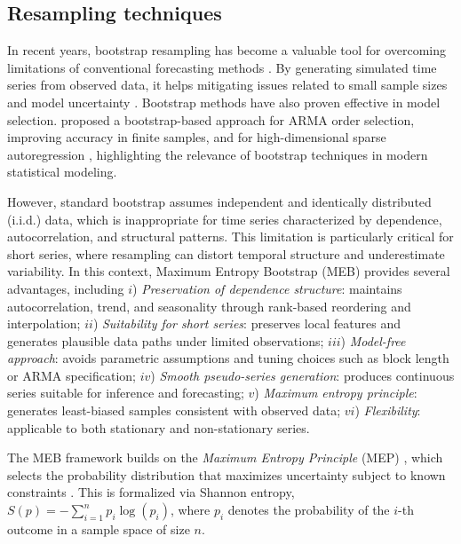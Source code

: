 \documentclass[ijoc,sglanonrev]{informs4}
\begin{document}
\subsection{Resampling techniques} \label{Subsec:resampling}

In recent years, bootstrap resampling has become a valuable tool for overcoming limitations of conventional forecasting methods \citep{hasni2019spare}. By generating simulated time series from observed data, it 
helps mitigating issues related to small sample sizes \citep{davison1997bootstrap} and model uncertainty \citep{sarris2020exploiting}.
Bootstrap methods have also proven effective in model selection. \citet{fenga2011bootstrap} proposed a bootstrap-based approach for ARMA order selection, improving accuracy in finite samples, and for high-dimensional sparse autoregression \citep{fenga2017lasso}, highlighting the relevance of bootstrap techniques in modern statistical modeling.

However, standard bootstrap assumes independent and identically distributed (i.i.d.) data, which is inappropriate for time series characterized by dependence, autocorrelation, and structural patterns. This limitation is particularly critical for short series, where resampling can distort temporal structure and underestimate variability. In this context, Maximum Entropy Bootstrap (MEB) provides several advantages, including 
$i$) {\it Preservation of dependence structure}: maintains autocorrelation, trend, and seasonality through rank-based reordering and interpolation;
$ii$)  {\it Suitability for short series}: preserves local features and generates plausible data paths under limited observations; 
$iii$)  {\it Model-free approach}: avoids parametric assumptions and tuning choices such as block length or ARMA specification; 
$iv$)  {\it Smooth pseudo-series generation}: produces continuous series suitable for inference and forecasting; 
$v$)  {\it Maximum entropy principle}: generates least-biased samples consistent with observed data; 
$vi$)  {\it Flexibility}: applicable to both stationary and non-stationary series.

The MEB framework builds on the {\it Maximum Entropy Principle} (MEP) \citep{shannon1948mathematical}, which selects the probability distribution that maximizes uncertainty subject to known constraints \citep{jaynes1957information}. This is formalized via Shannon entropy, $S(p) = -\sum_{i=1}^{n} p_i \log(p_i)$, where $p_i$ denotes the probability of the $i$-th outcome in a sample space of size $n$.
\end{document}
